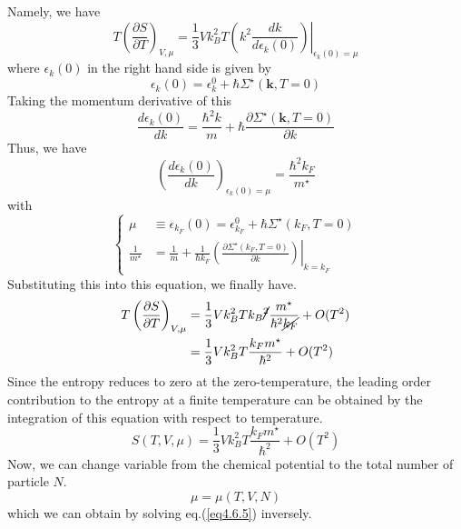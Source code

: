  Namely, we have
\begin{equation}
T\left( \frac{\partial S}{\partial T} \right)_{V,\mu}=\frac{1}{3}V k_B^2 T \left. \left( k^2 \frac{dk}{d\epsilon_k(0)} \right) \right|_{\epsilon_k(0)=\mu} 
\end{equation}
where $\epsilon_k(0)$ in the right hand side is given by
\begin{equation}\tag{4.6.25'}
\epsilon_k(0)=\epsilon_k^0 +\hbar\Sigma ^\star (\mathbf{k},T=0)
\end{equation}
 Taking the momentum derivative of this
\begin{equation}
\frac{d\epsilon_k(0)}{dk}=\frac{\hbar^2 k}{m}+\hbar \frac{\partial \Sigma ^\star (\mathbf{k},T=0)}{\partial k}
\end{equation}
 Thus, we have
\begin{equation}
\left(\frac{d\epsilon_k(0)}{dk}\right)_{\epsilon_k(0)=\mu} =\frac{\hbar^2 k_F}{m^\star}
\end{equation}
with
\begin{equation}
\left\{
\begin{aligned}
\mu&\equiv \epsilon_{k_F}(0)=\epsilon_{k_F}^0 +\hbar \Sigma^\star(k_F,T=0)\\
\frac{1}{m^\star} &=\frac{1}{m} +\frac{1}{\hbar k_F}\left. \left( \frac{\partial \Sigma^\star(k_F,T=0)}{\partial k} \right)\right|_{k=k_F}
\end{aligned}
\right.
\end{equation}
 Substituting this into this equation, we finally have.
\begin{equation}
\begin{aligned}
T\left( \frac{\partial S}{\partial T} \right)_{V,\mu}&=\frac{1}{3}V k_B^2 T k_B\cancel{^2} \frac{m^\star}{\hbar^2 \cancel{k_F}} +O(T^2)\\
&=\frac{1}{3}V k_B^2 T \frac{k_F m^\star}{\hbar^2}+O(T^2)
\end{aligned}
\end{equation}
 Since the entropy reduces to zero at the zero-temperature, the leading order contribution to the entropy at a finite temperature can be obtained by the integration of this equation with respect to temperature.
\begin{equation}
S(T,V,\mu)=\frac{1}{3}V k_B^2 T \frac{k_F m^\star}{\hbar^2}+O(T^2)
\end{equation}
 Now, we can change variable from the chemical potential to the total number of particle $N$.
\[
\mu=\mu(T,V,N)
\]
 which we can obtain by solving eq.(\ref{eq4.6.5}) inversely.
